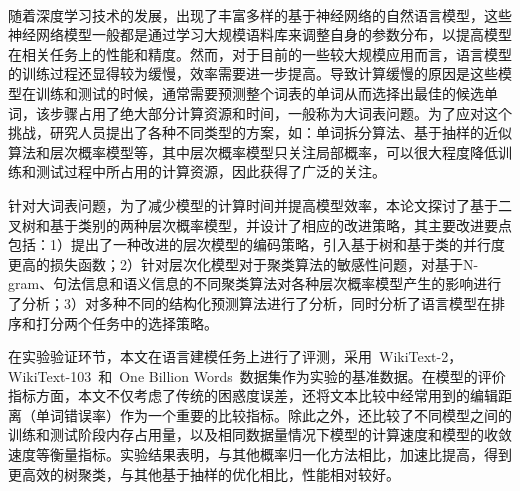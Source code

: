 \documentclass[master,openright,oneside,color]{buaathesis}
\begin{document}


\maketitle
\pagestyle{frontmatter}
\begin{cabstract}
~\

随着深度学习技术的发展，出现了丰富多样的基于神经网络的自然语言模型，这些神经网络模型一般都是通过学习大规模语料库来调整自身的参数分布，以提高模型在相关任务上的性能和精度。然而，对于目前的一些较大规模应用而言，语言模型的训练过程还显得较为缓慢，效率需要进一步提高。导致计算缓慢的原因是这些模型在训练和测试的时候，通常需要预测整个词表的单词从而选择出最佳的候选单词，该步骤占用了绝大部分计算资源和时间，一般称为大词表问题。为了应对这个挑战，研究人员提出了各种不同类型的方案，如：单词拆分算法、基于抽样的近似算法和层次概率模型等，其中层次概率模型只关注局部概率，可以很大程度降低训练和测试过程中所占用的计算资源，因此获得了广泛的关注。

针对大词表问题，为了减少模型的计算时间并提高模型效率，本论文探讨了基于二叉树和基于类别的两种层次概率模型，并设计了相应的改进策略，其主要改进要点包括：1）提出了一种改进的层次模型的编码策略，引入基于树和基于类的并行度更高的损失函数；2）针对层次化模型对于聚类算法的敏感性问题，对基于N-gram、句法信息和语义信息的不同聚类算法对各种层次概率模型产生的影响进行了分析；3）对多种不同的结构化预测算法进行了分析，同时分析了语言模型在排序和打分两个任务中的选择策略。

在实验验证环节，本文在语言建模任务上进行了评测，采用~WikiText-2， WikiText-103~和~One Billion Words~数据集作为实验的基准数据。在模型的评价指标方面，本文不仅考虑了传统的困惑度误差，还将文本比较中经常用到的编辑距离（单词错误率）作为一个重要的比较指标。除此之外，还比较了不同模型之间的训练和测试阶段内存占用量，以及相同数据量情况下模型的计算速度和模型的收敛速度等衡量指标。实验结果表明，与其他概率归一化方法相比，加速比提高，得到更高效的树聚类，与其他基于抽样的优化相比，性能相对较好。

\end{cabstract}
\end{document}

